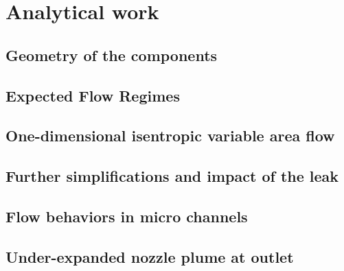 \section{Analytical work}


\subsection{Geometry of the components}


\subsection{Expected Flow Regimes}
\label{sec:expected-flow-regimes}

\newpage

\subsection{One-dimensional isentropic variable area flow}
\label{sec:one-dim-isentropic}

\newpage

\subsection{Further simplifications and impact of the leak}

\newpage

\subsection{Flow behaviors in micro channels}

\newpage

\subsection{Under-expanded nozzle plume at outlet}

\newpage
